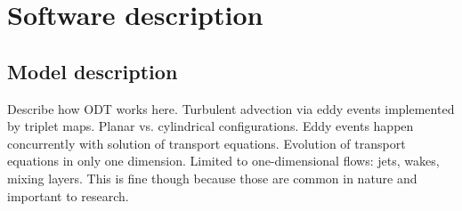 \documentclass[preprint,12pt, a4paper]{elsarticle}
\begin{document}
%



\section{Software description}
\label{sec:description}

\subsection{Model description}
\label{sub:model_description}

Describe how ODT works here. Turbulent advection via eddy events implemented by triplet maps. Planar vs. cylindrical configurations. Eddy events happen concurrently with solution of transport equations.  Evolution of transport equations in only one dimension. Limited to one-dimensional flows: jets, wakes, mixing layers. This is fine though because those are common in nature and important to research. 
\end{document}
